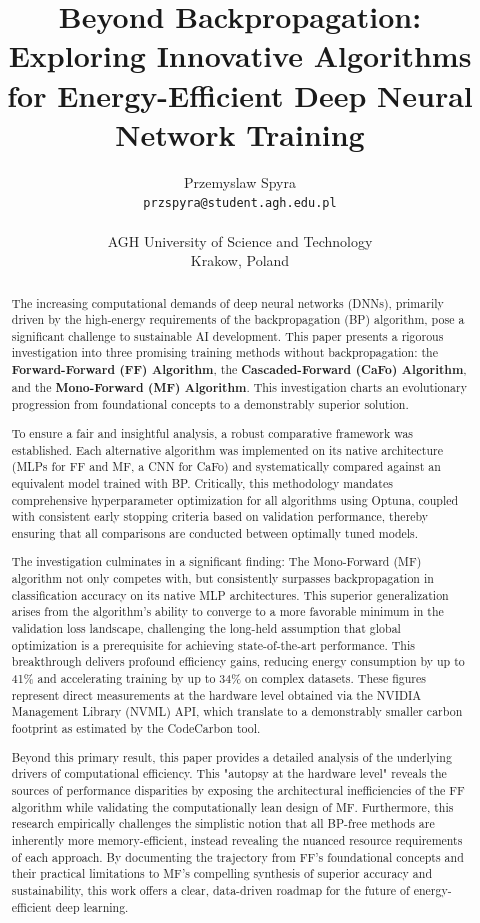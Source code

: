 \documentclass[11pt, english]{article}
\title{Beyond Backpropagation: Exploring Innovative Algorithms for Energy-Efficient Deep Neural Network Training}
\author{
    Przemyslaw Spyra \\
    \texttt{przspyra@student.agh.edu.pl} \\\\
    AGH University of Science and Technology \\
    Krakow, Poland
}
\date{}
\begin{document}
\maketitle

\begin{abstract}
The increasing computational demands of deep neural networks (DNNs), primarily driven by the high-energy requirements of the backpropagation (BP) algorithm, pose a significant challenge to sustainable AI development. This paper presents a rigorous investigation into three promising training methods without backpropagation: the \textbf{Forward-Forward (FF) Algorithm}, the \textbf{Cascaded-Forward (CaFo) Algorithm}, and the \textbf{Mono-Forward (MF) Algorithm}. This investigation charts an evolutionary progression from foundational concepts to a demonstrably superior solution.

To ensure a fair and insightful analysis, a robust comparative framework was established. Each alternative algorithm was implemented on its native architecture (MLPs for FF and MF, a CNN for CaFo) and systematically compared against an equivalent model trained with BP. Critically, this methodology mandates comprehensive hyperparameter optimization for all algorithms using Optuna, coupled with consistent early stopping criteria based on validation performance, thereby ensuring that all comparisons are conducted between optimally tuned models.

The investigation culminates in a significant finding: The Mono-Forward (MF) algorithm not only competes with, but consistently surpasses backpropagation in classification accuracy on its native MLP architectures. This superior generalization arises from the algorithm's ability to converge to a more favorable minimum in the validation loss landscape, challenging the long-held assumption that global optimization is a prerequisite for achieving state-of-the-art performance. This breakthrough delivers profound efficiency gains, reducing energy consumption by up to 41\% and accelerating training by up to 34\% on complex datasets. These figures represent direct measurements at the hardware level obtained via the NVIDIA Management Library (NVML) API, which translate to a demonstrably smaller carbon footprint as estimated by the CodeCarbon tool.

Beyond this primary result, this paper provides a detailed analysis of the underlying drivers of computational efficiency. This "autopsy at the hardware level" reveals the sources of performance disparities by exposing the architectural inefficiencies of the FF algorithm while validating the computationally lean design of MF. Furthermore, this research empirically challenges the simplistic notion that all BP-free methods are inherently more memory-efficient, instead revealing the nuanced resource requirements of each approach. By documenting the trajectory from FF's foundational concepts and their practical limitations to MF's compelling synthesis of superior accuracy and sustainability, this work offers a clear, data-driven roadmap for the future of energy-efficient deep learning.
\end{abstract}
\end{document}
